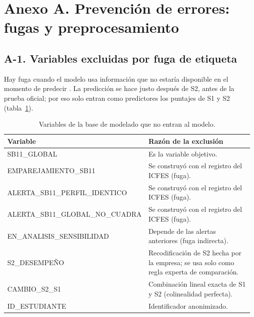 \documentclass[10pt,letterpaper,twocolumn]{article}
\newcommand{\parencite}{\citep}
\renewcommand{\thetable}{\Roman{table}}
\begin{document}
\section*{Anexo A. Prevención de errores: fugas y preprocesamiento}
\setcounter{table}{0}\renewcommand{\thetable}{A-\Roman{table}}
\setcounter{figure}{0}

\subsection*{A-1. Variables excluidas por fuga de etiqueta}

Hay fuga cuando el modelo usa información que no estaría disponible en el momento de predecir \parencite{kaufman2012leakage}. La predicción se hace justo después de S2, antes de la prueba oficial; por eso solo entran como predictores los puntajes de S1 y S2 (tabla~\ref{tb:excluidas}).

\begin{table}[!t]
\centering
\footnotesize
\renewcommand{\arraystretch}{1.15}
\begin{tabularx}{\columnwidth}{@{}>{\raggedright\arraybackslash}p{} >{\raggedright\arraybackslash}X@{}}
\toprule
\textbf{Variable} & \textbf{Razón de la exclusión} \\
\midrule
SB11\_GLOBAL & Es la variable objetivo. \\
EMPAREJAMIENTO\_SB11 & Se construyó con el registro del ICFES (fuga). \\
ALERTA\_SB11\_PERFIL\_\allowbreak IDENTICO & Se construyó con el registro del ICFES (fuga). \\
ALERTA\_SB11\_GLOBAL\_\allowbreak NO\_CUADRA & Se construyó con el registro del ICFES (fuga). \\
EN\_ANALISIS\_\allowbreak SENSIBILIDAD & Depende de las alertas anteriores (fuga indirecta). \\
S2\_DESEMPEÑO & Recodificación de S2 hecha por la empresa; se usa solo como regla experta de comparación. \\
CAMBIO\_S2\_S1 & Combinación lineal exacta de S1 y S2 (colinealidad perfecta). \\
ID\_ESTUDIANTE & Identificador anonimizado. \\
\bottomrule
\end{tabularx}
\caption{Variables de la base de modelado que no entran al modelo.}
\label{tb:excluidas}
\end{table}
\end{document}
